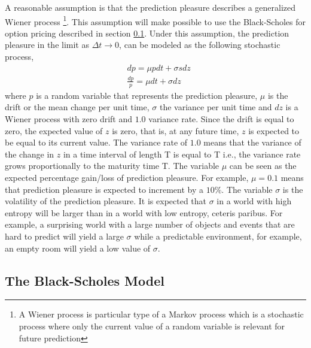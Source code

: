 \documentclass[11pt,twocolumn]{article}
\begin{document}
A reasonable assumption is that the prediction pleasure describes a generalized Wiener process \footnote{A Wiener process is particular type of a Markov process which is a stochastic process where only the current value of a random variable is relevant for future prediction}. This assumption will make possible to use the  Black-Scholes for option pricing described in section \ref{}. 
Under this assumption, the prediction pleasure in the limit as $\Delta t \to 0$, can be modeled as the following stochastic process, 
\begin{equation*}
\begin{split}
& dp = \mu p dt + \sigma s dz \\
& \frac{dp}{p}= \mu dt + \sigma dz
\end{split}
\label{eq:wiener}
\end{equation*}
where $p$ is a random variable that represents the prediction pleasure, $\mu$ is the drift or the mean change per unit time, $\sigma$ the variance per unit time and $dz$ is a Wiener process with zero drift and $1.0$ variance rate. Since the drift is equal to zero, the expected value of $z$ is zero, that is, at any future time, $z$ is expected to be equal to its current value. The variance rate of $1.0$ means that the variance of the change in $z$ in a
time interval of length T is equal to T i.e., the variance rate grows proportionally to the maturity time T. 
The variable $\mu$ can be seen as the expected percentage gain/loss of prediction pleasure. For example, $\mu = 0.1$ means that prediction pleasure is expected to increment by a $10\%$. The variable $\sigma$ is the volatility of the prediction pleasure. It is expected that $\sigma$ in a world with high entropy will be larger than in a world with low entropy, ceteris paribus. For example, a surprising world with a large number of objects and events that are hard to predict will yield a large $\sigma$ while a predictable environment, for example, an empty room will yield a low value of $\sigma$. 


\subsection{The Black-Scholes Model}
\end{document}
